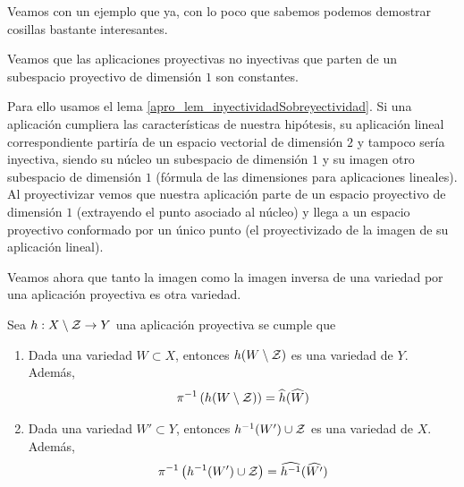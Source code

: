 Veamos con un ejemplo que ya, con lo poco que sabemos podemos demostrar cosillas bastante interesantes.
\begin{exa}
	Veamos que las aplicaciones proyectivas no inyectivas que parten de un subespacio proyectivo de dimensión $1$ son constantes.
	
	Para ello usamos el lema \ref{apro_lem_inyectividadSobreyectividad}. Si una aplicación cumpliera las características de nuestra hipótesis, su aplicación lineal correspondiente partiría de un espacio vectorial de dimensión $2$ y tampoco sería inyectiva, siendo su núcleo un subespacio de dimensión $1$ y su imagen otro subespacio de dimensión $1$ (fórmula de las dimensiones para aplicaciones lineales). Al proyectivizar vemos que nuestra aplicación parte de un espacio proyectivo de dimensión $1$ (extrayendo el punto asociado al núcleo) y llega a un espacio proyectivo conformado por un único punto (el proyectivizado de la imagen de su aplicación lineal).
\end{exa}
Veamos ahora que tanto la imagen como la imagen inversa de una variedad por una aplicación proyectiva es otra variedad.
\begin{lem}
	\label{apro_lem_preservaVariedades}
	Sea $h:X\setminus\mathcal{Z}\rightarrow Y$ una aplicación proyectiva se cumple que
	\begin{enumerate}
		\item Dada una variedad $W\subset X$, entonces $h(W\setminus\mathcal{Z})$ es una variedad de $Y$. Además, \begin{equation*}
			\pi^{-1}\left(h(W\setminus \mathcal{Z})\right)=\widehat{h}(\widehat{W})
		\end{equation*}
		\item Dada una variedad $W'\subset Y$, entonces $h^{-1}(W')\cup\mathcal{Z}$ es una variedad de $X$. Además, \begin{equation*}
			\pi^{-1}\left(h^{-1}(W')\cup\mathcal{Z}\right)=\widehat{h^{-1}}(\widehat{W'})
		\end{equation*}
	\end{enumerate}
\end{lem}
